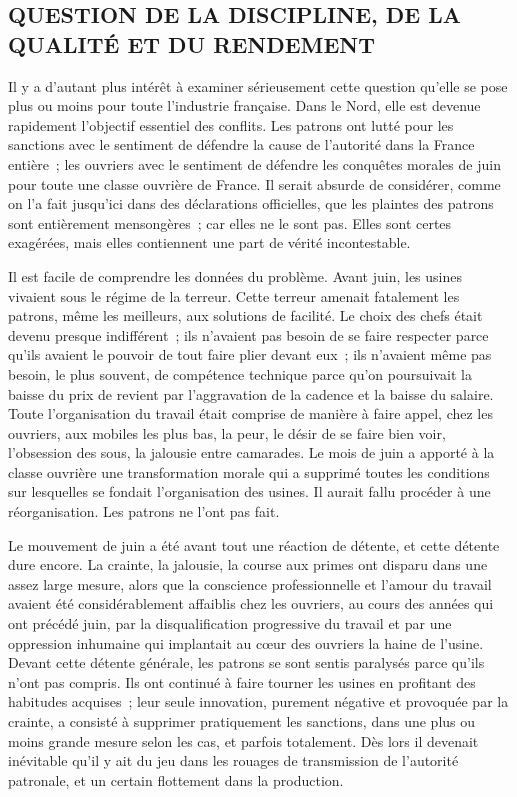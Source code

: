\documentclass[french,twoside]{book} %
\begin{document}
\subsection[QUESTION DE LA DISCIPLINE, DE LA QUALITÉ ET DU RENDEMENT]{QUESTION DE LA DISCIPLINE, DE LA QUALITÉ ET DU RENDEMENT}
\noindent Il y a d'autant plus intérêt à examiner sérieusement cette question qu'elle se pose plus ou moins pour toute l'industrie française. Dans le Nord, elle est devenue rapidement l'objectif essentiel des conflits. Les patrons ont lutté pour les sanctions avec le sentiment de défendre la cause de l'autorité dans la France entière ; les ouvriers avec le sentiment de défendre les conquêtes morales de juin pour toute une classe ouvrière de France. Il serait absurde de considérer, comme on l'a fait jusqu'ici dans des déclarations officielles, que les plaintes des patrons sont entièrement mensongères ; car elles ne le sont pas. Elles sont certes exagérées, mais elles contiennent une part de vérité incontestable.\par
Il est facile de comprendre les données du problème. Avant juin, les usines vivaient sous le régime de la terreur. Cette terreur amenait fatalement les patrons, même les meilleurs, aux solutions de facilité. Le choix des chefs était devenu presque indifférent ; ils n'avaient pas besoin de se faire respecter parce qu'ils avaient le pouvoir de tout faire plier devant eux ; ils n'avaient même pas besoin, le plus souvent, de compétence technique parce qu'on poursuivait la baisse du prix de revient par l'aggravation de la cadence et la baisse du salaire. Toute l'organisation du travail était comprise de manière à faire appel, chez les ouvriers, aux mobiles les plus bas, la peur, le désir de se faire bien voir, l'obsession des sous, la jalousie entre camarades. Le mois de juin a apporté à la classe ouvrière une transformation morale qui a supprimé toutes les conditions sur lesquelles se fondait l'organisation des usines. Il aurait fallu procéder à une réorganisation. Les patrons ne l'ont pas fait.\par
Le mouvement de juin a été avant tout une réaction de détente, et cette détente dure encore. La crainte, la jalousie, la course aux primes ont disparu dans une assez large mesure, alors que la conscience professionnelle et l'amour du travail avaient été considérablement affaiblis chez les ouvriers, au cours des années qui ont précédé juin, par la disqualification progressive du travail et par une oppression inhumaine qui implantait au cœur des ouvriers la haine de l'usine. Devant cette détente générale, les patrons se sont sentis paralysés parce qu'ils n'ont pas compris. Ils ont continué à faire tourner les usines en profitant des habitudes acquises ; leur seule innovation, purement négative et provoquée par la crainte, a consisté à supprimer pratiquement les sanctions, dans une plus ou moins grande mesure selon les cas, et parfois totalement. Dès lors il devenait inévitable qu'il y ait du jeu dans les rouages de transmission de l'autorité patronale, et un certain flottement dans la production.\par
\end{document}
